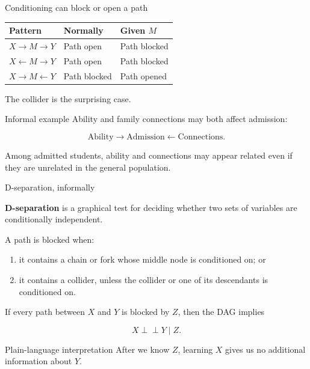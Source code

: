 \documentclass[aspectratio=43,11pt]{beamer}
\begin{document}
\begin{frame}{Conditioning can block or open a path}

\begin{table}
\centering
\begin{tabular}{lll}
\toprule
\textbf{Pattern} & \textbf{Normally} & \textbf{Given \(M\)} \\
\midrule
\(X\rightarrow M\rightarrow Y\)
  & Path open & Path blocked \\[2mm]

\(X\leftarrow M\rightarrow Y\)
  & Path open & Path blocked \\[2mm]

\(X\rightarrow M\leftarrow Y\)
  & Path blocked & Path opened \\
\bottomrule
\end{tabular}
\end{table}

\medskip

The collider is the surprising case.

\begin{exampleblock}{Informal example}
Ability and family connections may both affect admission:

\[
\text{Ability}
\longrightarrow
\text{Admission}
\longleftarrow
\text{Connections}.
\]

Among admitted students, ability and connections may appear related even
if they are unrelated in the general population.
\end{exampleblock}

\end{frame}

\begin{frame}{D-separation, informally}

\textbf{D-separation} is a graphical test for deciding whether two sets
of variables are conditionally independent.

\medskip

A path is blocked when:

\begin{enumerate}
  \item it contains a chain or fork whose middle node is conditioned on; or
  \item it contains a collider, unless the collider or one of its
        descendants is conditioned on.
\end{enumerate}

\medskip

If every path between \(X\) and \(Y\) is blocked by \(Z\), then the DAG
implies

\[
X \perp\!\!\!\perp Y \mid Z.
\]

\begin{block}{Plain-language interpretation}
After we know \(Z\), learning \(X\) gives us no additional information
about \(Y\).
\end{block}

\end{frame}
\end{document}

